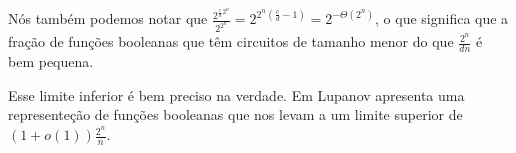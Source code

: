Nós também podemos notar que $\frac{2^{\frac{c}{d}2^{n}}}{2^{2^{n}}} = 2^{2^{n}(\frac{c}{d} - 1)} = 2^{-\Theta(2^{n})}$, o que significa que a fração de funções booleanas que têm circuitos de tamanho menor do que $\frac{2^{n}}{dn}$ é bem pequena.

Esse limite inferior é bem preciso na verdade. Em \cite{lupanov1958method} Lupanov apresenta uma representeção de funções booleanas que nos levam a um limite superior de $(1 + o(1))\frac{2^{n}}{n}$.












